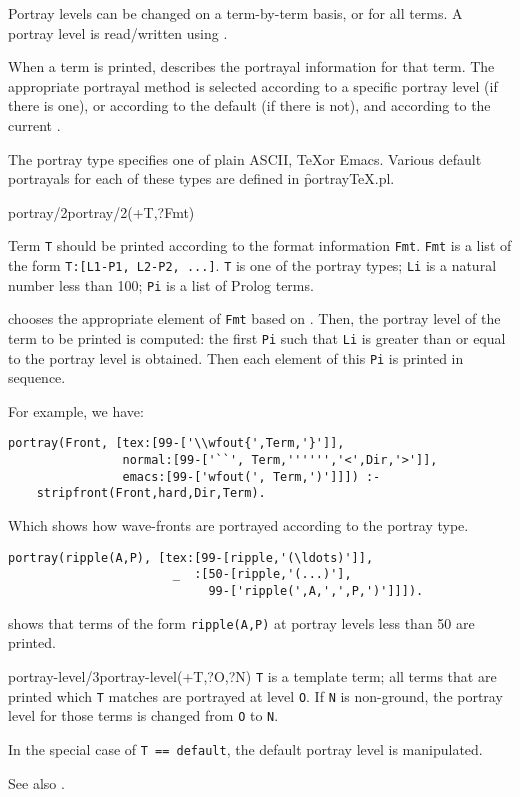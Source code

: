 Portray levels can be changed on a term-by-term basis, or for all
terms.  A portray level is read/written using .

When a term is printed,  describes the portrayal
information for that term.  The appropriate portrayal method is
selected according to a specific portray level (if there is one), or
according to the default (if there is not), and according to the
current .

The portray type specifies one of plain ASCII, \TeX or Emacs.  Various
default portrayals for each of these types are defined in
\f{portrayTeX.pl}. 

\begin{predicate}{portray/2}{portray/2(+T,?Fmt)}%

Term {\tt T} should be printed according to the format information
{\tt Fmt}.  {\tt Fmt} is a list of the form {\tt T:[L1-P1, L2-P2,
...]}.  {\tt T} is one of the portray types;  {\tt Li} is a natural
number less than 100; {\tt Pi} is a list of Prolog terms.

\clam chooses the appropriate element of {\tt Fmt} based on
.  Then, the portray level of the term to be printed
is computed: the first {\tt Pi} such that {\tt Li} is greater than or
equal to the portray level is obtained.  Then each element of this
{\tt Pi} is printed in sequence.

For example, we have:
\begin{verbatim}
portray(Front, [tex:[99-['\\wfout{',Term,'}']],
                normal:[99-['``', Term,'''''','<',Dir,'>']],
                emacs:[99-['wfout(', Term,')']]]) :-
    stripfront(Front,hard,Dir,Term).
\end{verbatim}
Which shows how wave-fronts are portrayed according to the portray
type.

\begin{verbatim}
portray(ripple(A,P), [tex:[99-[ripple,'(\ldots)']],
                       _  :[50-[ripple,'(...)'],
                            99-['ripple(',A,',',P,')']]]).
\end{verbatim}
shows that terms of the form {\tt ripple(A,P)} at portray levels less
than 50 are printed.

\end{predicate}

\begin{predicate}{portray-level/3}{portray-level(+T,?O,?N)}%
{\tt T} is a template term; all terms that are printed which {\tt T}
matches are portrayed at level {\tt O}.  If {\tt N} is non-ground, the
portray level for those terms is changed from {\tt O} to {\tt N}.

In the special case of {\tt T == default}, the default portray level
is manipulated.

See also .
\end{predicate}

